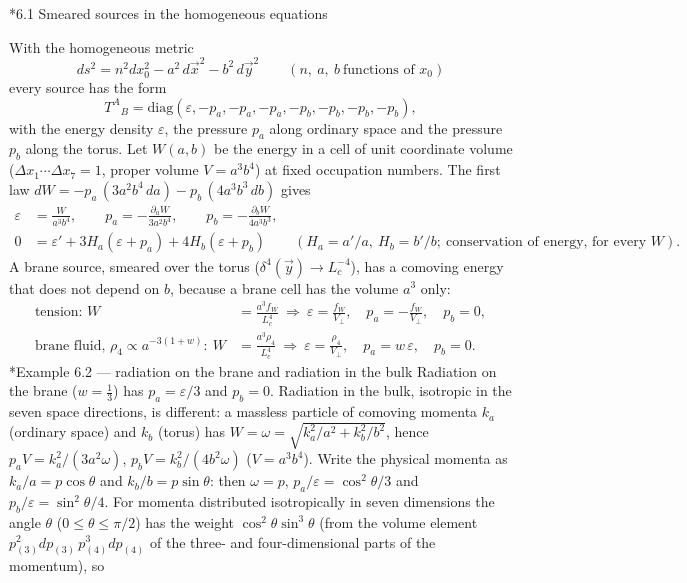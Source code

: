 \documentclass[10pt,a4paper]{article}
\makeatletter
\renewcommand\subsection{\@startsection{subsection}{2}{\z@}{-3.25ex\@plus -1ex \@minus -.2ex}{1.5ex \@plus .2ex}{\normalfont\large\bfseries\raggedright}}
\renewcommand\subsubsection{\@startsection{subsubsection}{3}{\z@}{-3.25ex\@plus -1ex \@minus -.2ex}{1.5ex \@plus .2ex}{\normalfont\normalsize\bfseries\raggedright}}
\makeatother
\begin{document}
\subsection*{6.1 Smeared sources in the homogeneous equations}
With the homogeneous metric
\begin{equation*}
ds^2=n^2dx_0^2-a^2\,d\vec x^2-b^2\,d\vec y^2\qquad(n,\ a,\ b\ \text{functions of }x_0)
\end{equation*}
every source has the form
\begin{equation*}
T^A{}_B=\mathrm{diag}(\varepsilon,-p_a,-p_a,-p_a,-p_b,-p_b,-p_b,-p_b),
\end{equation*}
with the energy density $\varepsilon$, the pressure $p_a$ along ordinary space and the pressure $p_b$ along the torus. Let $W(a,b)$ be the energy in a cell of unit coordinate volume ($\Delta x_1\cdots\Delta x_7=1$, proper volume $V=a^3b^4$) at fixed occupation numbers. The first law $dW=-p_a\,(3a^2b^4\,da)-p_b\,(4a^3b^3\,db)$ gives
\begin{align*}
\varepsilon&=\frac W{a^3b^4},\qquad p_a=-\frac{\partial_aW}{3a^2b^4},\qquad p_b=-\frac{\partial_bW}{4a^3b^3}, \\
0&=\varepsilon'+3H_a(\varepsilon+p_a)+4H_b(\varepsilon+p_b)\qquad(H_a=a'/a,\ H_b=b'/b;\ \text{conservation of energy, for every }W).
\end{align*}
A brane source, smeared over the torus ($\delta^4(\vec y)\to L_c^{-4}$), has a comoving energy that does not depend on $b$, because a brane cell has the volume $a^3$ only:
\begin{align*}
\text{tension: }W&=\frac{a^3f_W}{L_c^4}\ \Rightarrow\ \varepsilon=\frac{f_W}{V_\perp},\quad p_a=-\frac{f_W}{V_\perp},\quad p_b=0, \\
\text{brane fluid, }\rho_4\propto a^{-3(1+w)}:\ W&=\frac{a^3\rho_4}{L_c^4}\ \Rightarrow\ \varepsilon=\frac{\rho_4}{V_\perp},\quad p_a=w\,\varepsilon,\quad p_b=0 .
\end{align*}
\subsubsection*{Example 6.2 — radiation on the brane and radiation in the bulk}
Radiation on the brane ($w=\frac13$) has $p_a=\varepsilon/3$ and $p_b=0$. Radiation in the bulk, isotropic in the seven space directions, is different: a massless particle of comoving momenta $k_a$ (ordinary space) and $k_b$ (torus) has $W=\omega=\sqrt{k_a^2/a^2+k_b^2/b^2}$, hence $p_aV=k_a^2/(3a^2\omega)$, $p_bV=k_b^2/(4b^2\omega)$ ($V=a^3b^4$). Write the physical momenta as $k_a/a=p\cos\theta$ and $k_b/b=p\sin\theta$: then $\omega=p$, $p_a/\varepsilon=\cos^2\theta/3$ and $p_b/\varepsilon=\sin^2\theta/4$. For momenta distributed isotropically in seven dimensions the angle $\theta$ ($0\le\theta\le\pi/2$) has the weight $\cos^2\theta\sin^3\theta$ (from the volume element $p_{(3)}^2dp_{(3)}\,p_{(4)}^3dp_{(4)}$ of the three- and four-dimensional parts of the momentum), so
\end{document}
